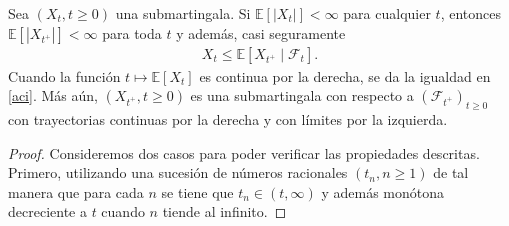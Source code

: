 \begin{proposition}
Sea $(X_t, t \geq 0)$ una submartingala. Si $\mathbb{E}[|X_t|] < \infty$ para cualquier $t$, entonces $\mathbb{E}[|X_{t^{+}}|] < \infty$ para toda $t$ y además, casi seguramente
\begin{align}
	X_t \leq \mathbb{E} \left[ X_{t^{+}} \mid \mathcal{F}_t \right]. \label{aci}
\end{align}
Cuando la función $t \mapsto \mathbb{E}[X_t]$ es continua por la derecha, se da la igualdad en \ref{aci}. Más aún, $(X_{t^{+}}, t \geq 0)$ es una submartingala con respecto a $(\mathcal{F}_{t^{+}})_{t \geq 0}$ con trayectorias continuas por la derecha y con límites por la izquierda.
\end{proposition}
\begin{proof}
Consideremos dos casos para poder verificar las propiedades descritas. Primero, utilizando una sucesión de números racionales $(t_n, n \geq 1)$ de tal manera que para cada $n$ se tiene que $t_n \in (t, \infty)$ y además monótona decreciente a $t$ cuando $n$ tiende al infinito.


\end{proof}
